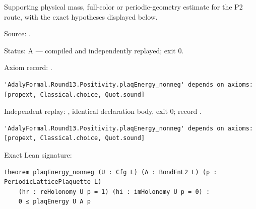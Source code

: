 \begin{theorem}[bp-451]
\label{bp-451}
\uses{}
\leanok
Supporting physical mass, full-color or periodic-geometry estimate for the P2 route, with the exact hypotheses displayed below.

\par Source: \texttt{}.
\par Status: A — compiled and independently replayed; exit 0.
\par Axiom record: \texttt{}.
\begin{verbatim}
'AdalyFormal.Round13.Positivity.plaqEnergy_nonneg' depends on axioms: [propext, Classical.choice, Quot.sound]
\end{verbatim}
\par Independent replay: \texttt{}, identical declaration body, exit 0; record \texttt{}.
\begin{verbatim}
'AdalyFormal.Round13.Positivity.plaqEnergy_nonneg' depends on axioms: [propext, Classical.choice, Quot.sound]
\end{verbatim}
\par Exact Lean signature:
\begin{verbatim}
theorem plaqEnergy_nonneg (U : Cfg L) (A : BondFnL2 L) (p : PeriodicLatticePlaquette L)
    (hr : reHolonomy U p = 1) (hi : imHolonomy U p = 0) :
    0 ≤ plaqEnergy U A p
\end{verbatim}
\end{theorem}

